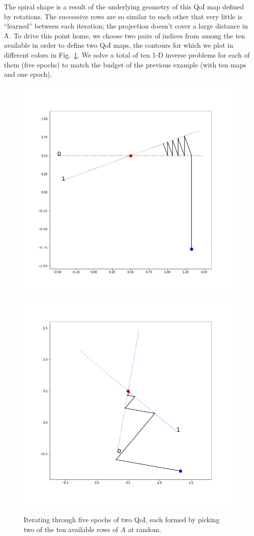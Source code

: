 The spiral shape is a result of the underlying geometry of this QoI map defined by rotations. The successive rows are so similar to each other that very little is ``learned'' between each iteration; the projection doesn't cover a large distance in ${\Lambda}$.
To drive this point home, we choose two pairs of indices from among the ten available in order to define two QoI maps, the contours for which we plot in different colors in Fig.~\ref{fig:iterative-linear-demo-pair}.
We solve a total of ten 1-D inverse problems for each of them (five epochs) to match the budget of the previous example (with ten maps and one epoch).

\begin{figure}
  \centering
  \includegraphics[width=0.475\linewidth]{examples/iterative/10D-fewepochs-pair}
  \includegraphics[width=0.475\linewidth]{examples/iterative/10D-fewepochs-pair-alt}
  \caption{
  Iterating through five epochs of two QoI, each formed by picking two of the ten available rows of $A$ at random.
  }
  \label{fig:iterative-linear-demo-pair}
\end{figure}


